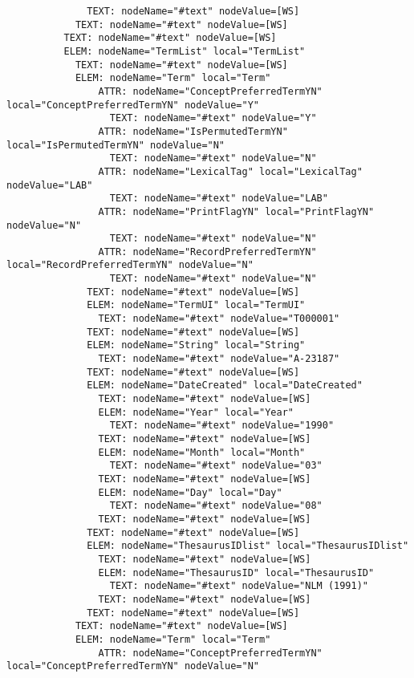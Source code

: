 \documentclass[11pt,english]{article}
\begin{document}
\begin{enumerate}
\begin{lstlisting}
              TEXT: nodeName="#text" nodeValue=[WS]
            TEXT: nodeName="#text" nodeValue=[WS]
          TEXT: nodeName="#text" nodeValue=[WS]
          ELEM: nodeName="TermList" local="TermList"
            TEXT: nodeName="#text" nodeValue=[WS]
            ELEM: nodeName="Term" local="Term"
                ATTR: nodeName="ConceptPreferredTermYN" local="ConceptPreferredTermYN" nodeValue="Y"
                  TEXT: nodeName="#text" nodeValue="Y"
                ATTR: nodeName="IsPermutedTermYN" local="IsPermutedTermYN" nodeValue="N"
                  TEXT: nodeName="#text" nodeValue="N"
                ATTR: nodeName="LexicalTag" local="LexicalTag" nodeValue="LAB"
                  TEXT: nodeName="#text" nodeValue="LAB"
                ATTR: nodeName="PrintFlagYN" local="PrintFlagYN" nodeValue="N"
                  TEXT: nodeName="#text" nodeValue="N"
                ATTR: nodeName="RecordPreferredTermYN" local="RecordPreferredTermYN" nodeValue="N"
                  TEXT: nodeName="#text" nodeValue="N"
              TEXT: nodeName="#text" nodeValue=[WS]
              ELEM: nodeName="TermUI" local="TermUI"
                TEXT: nodeName="#text" nodeValue="T000001"
              TEXT: nodeName="#text" nodeValue=[WS]
              ELEM: nodeName="String" local="String"
                TEXT: nodeName="#text" nodeValue="A-23187"
              TEXT: nodeName="#text" nodeValue=[WS]
              ELEM: nodeName="DateCreated" local="DateCreated"
                TEXT: nodeName="#text" nodeValue=[WS]
                ELEM: nodeName="Year" local="Year"
                  TEXT: nodeName="#text" nodeValue="1990"
                TEXT: nodeName="#text" nodeValue=[WS]
                ELEM: nodeName="Month" local="Month"
                  TEXT: nodeName="#text" nodeValue="03"
                TEXT: nodeName="#text" nodeValue=[WS]
                ELEM: nodeName="Day" local="Day"
                  TEXT: nodeName="#text" nodeValue="08"
                TEXT: nodeName="#text" nodeValue=[WS]
              TEXT: nodeName="#text" nodeValue=[WS]
              ELEM: nodeName="ThesaurusIDlist" local="ThesaurusIDlist"
                TEXT: nodeName="#text" nodeValue=[WS]
                ELEM: nodeName="ThesaurusID" local="ThesaurusID"
                  TEXT: nodeName="#text" nodeValue="NLM (1991)"
                TEXT: nodeName="#text" nodeValue=[WS]
              TEXT: nodeName="#text" nodeValue=[WS]
            TEXT: nodeName="#text" nodeValue=[WS]
            ELEM: nodeName="Term" local="Term"
                ATTR: nodeName="ConceptPreferredTermYN" local="ConceptPreferredTermYN" nodeValue="N"

\end{lstlisting}
\end{enumerate}
\end{document}
